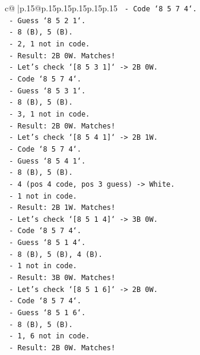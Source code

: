 \documentclass{article}
\begin{document}
{\begin{supertabular}{c@{$\;$}|p{.15\linewidth}@{}p{.15\linewidth}p{.15\linewidth}p{.15\linewidth}p{.15\linewidth}p{.15\linewidth}}
{{{\texttt{          {-} Code `8 5 7 4`.} \\
\texttt{          {-} Guess `8 5 2 1`.} \\
\texttt{          {-} 8 (B), 5 (B).} \\
\texttt{          {-} 2, 1 not in code.} \\
\texttt{          {-} Result: 2B 0W. Matches!} \\
\texttt{        {-} Let's check `{[}8 5 3 1{]}` {-}> 2B 0W.} \\
\texttt{          {-} Code `8 5 7 4`.} \\
\texttt{          {-} Guess `8 5 3 1`.} \\
\texttt{          {-} 8 (B), 5 (B).} \\
\texttt{          {-} 3, 1 not in code.} \\
\texttt{          {-} Result: 2B 0W. Matches!} \\
\texttt{        {-} Let's check `{[}8 5 4 1{]}` {-}> 2B 1W.} \\
\texttt{          {-} Code `8 5 7 4`.} \\
\texttt{          {-} Guess `8 5 4 1`.} \\
\texttt{          {-} 8 (B), 5 (B).} \\
\texttt{          {-} 4 (pos 4 code, pos 3 guess) {-}> White.} \\
\texttt{          {-} 1 not in code.} \\
\texttt{          {-} Result: 2B 1W. Matches!} \\
\texttt{        {-} Let's check `{[}8 5 1 4{]}` {-}> 3B 0W.} \\
\texttt{          {-} Code `8 5 7 4`.} \\
\texttt{          {-} Guess `8 5 1 4`.} \\
\texttt{          {-} 8 (B), 5 (B), 4 (B).} \\
\texttt{          {-} 1 not in code.} \\
\texttt{          {-} Result: 3B 0W. Matches!} \\
\texttt{        {-} Let's check `{[}8 5 1 6{]}` {-}> 2B 0W.} \\
\texttt{          {-} Code `8 5 7 4`.} \\
\texttt{          {-} Guess `8 5 1 6`.} \\
\texttt{          {-} 8 (B), 5 (B).} \\
\texttt{          {-} 1, 6 not in code.} \\
\texttt{          {-} Result: 2B 0W. Matches!} \\
}}}
\end{supertabular}}
\end{document}
